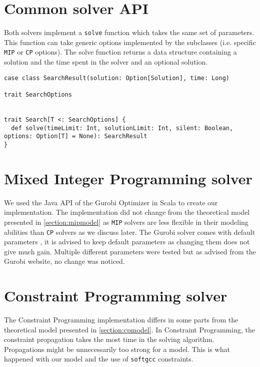 \documentclass[../thesis.tex]{subfiles}
\begin{document}
\section{Common solver API}

Both solvers implement a \texttt{solve} function which takes the same set of parameters.
This function can take generic options implemented by the subclasses (i.e. specific \texttt{MIP} or \texttt{CP} options).
The solve function returns a data structure containing a solution and the time spent in the solver and an optional solution.

\begin{lstlisting}[style=scalaStyle,caption={Solver API},captionpos=b]
case class SearchResult(solution: Option[Solution], time: Long)

trait SearchOptions


trait Search[T <: SearchOptions] {
  def solve(timeLimit: Int, solutionLimit: Int, silent: Boolean, options: Option[T] = None): SearchResult
}
\end{lstlisting}

\section{Mixed Integer Programming solver}

We used the Java API \cite{gurobi:java} of the Gurobi Optimizer in Scala to create our implementation. 
The implementation did not change from the theoretical model presented in \autoref{section:mipmodel} as 
\texttt{MIP} solvers are less flexible in their modeling abilities than \texttt{CP} solvers as we discuss later. The Gurobi solver 
comes with default parameters \cite{gurobi:parameters}, it is advised to keep default parameters as 
changing them does not give much gain. Multiple different parameters were tested but as advised from the Gurobi website, 
no change was noticed.

\section{Constraint Programming solver}

The Constraint Programming implementation differs in some parts from the theoretical model 
presented in \autoref{section:cpmodel}. In Constraint Programming, the constraint propagation 
takes the most time in the solving algorithm. Propagations might be unnecessarily too strong for a model.
This is what happened with our model and the use of \texttt{softgcc} constraints. 
\end{document}
